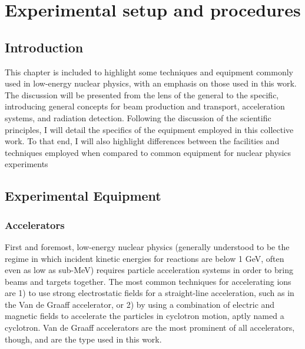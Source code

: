 %
%
%
%
%
%
%
%
%
%

%
%

\chapter{Experimental setup and procedures}
\label{chap: experiment}

\section{Introduction}

This chapter is included to highlight some techniques and equipment commonly used in low-energy nuclear physics, with an emphasis on those used in this work. The discussion will be presented from the lens of the general to the specific, introducing general concepts for beam production and transport, acceleration systems, and radiation detection. Following the discussion of the scientific principles, I will detail the specifics of the equipment employed in this collective work. To that end, I will also highlight differences between the facilities and techniques employed when compared to common equipment for nuclear physics experiments


\section{Experimental Equipment}
\label{sec: equipment}



\subsection{Accelerators}
\label{sec: accelerators}

First and foremost, low-energy nuclear physics (generally understood to be the regime in which incident kinetic energies for reactions are below 1 GeV, often even as low as sub-MeV) requires particle acceleration systems in order to bring beams and targets together. The most common techniques for accelerating ions are 1) to use strong electrostatic fields for a straight-line acceleration, such as in the Van de Graaff accelerator, or 2)  by using a combination of electric and magnetic fields to accelerate the particles in cyclotron motion, aptly named a cyclotron. Van de Graaff accelerators are the most prominent of all accelerators, though, and are the type used in this work. 


